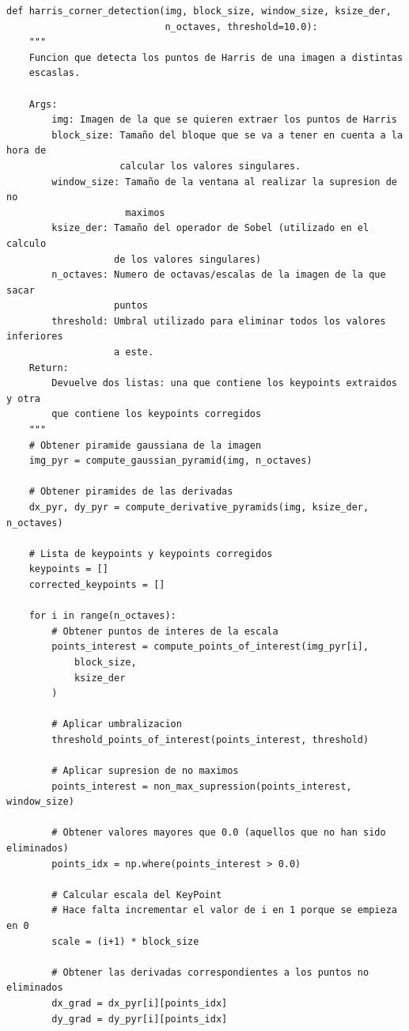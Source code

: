 \documentclass[11pt,a4paper]{article}
\begin{document}
\begin{lstlisting}
def harris_corner_detection(img, block_size, window_size, ksize_der,
                            n_octaves, threshold=10.0):
    """
    Funcion que detecta los puntos de Harris de una imagen a distintas
    escaslas.

    Args:
        img: Imagen de la que se quieren extraer los puntos de Harris
        block_size: Tamaño del bloque que se va a tener en cuenta a la hora de
                    calcular los valores singulares.
        window_size: Tamaño de la ventana al realizar la supresion de no
                     maximos
        ksize_der: Tamaño del operador de Sobel (utilizado en el calculo
                   de los valores singulares)
        n_octaves: Numero de octavas/escalas de la imagen de la que sacar
                   puntos
        threshold: Umbral utilizado para eliminar todos los valores inferiores
                   a este.
    Return:
        Devuelve dos listas: una que contiene los keypoints extraidos y otra
        que contiene los keypoints corregidos
    """
    # Obtener piramide gaussiana de la imagen
    img_pyr = compute_gaussian_pyramid(img, n_octaves)

    # Obtener piramides de las derivadas
    dx_pyr, dy_pyr = compute_derivative_pyramids(img, ksize_der, n_octaves)

    # Lista de keypoints y keypoints corregidos
    keypoints = []
    corrected_keypoints = []

    for i in range(n_octaves):
        # Obtener puntos de interes de la escala
        points_interest = compute_points_of_interest(img_pyr[i],
            block_size,
            ksize_der
        )

        # Aplicar umbralizacion
        threshold_points_of_interest(points_interest, threshold)

        # Aplicar supresion de no maximos
        points_interest = non_max_supression(points_interest, window_size)

        # Obtener valores mayores que 0.0 (aquellos que no han sido eliminados)
        points_idx = np.where(points_interest > 0.0)

        # Calcular escala del KeyPoint
        # Hace falta incrementar el valor de i en 1 porque se empieza en 0
        scale = (i+1) * block_size

        # Obtener las derivadas correspondientes a los puntos no eliminados
        dx_grad = dx_pyr[i][points_idx]
        dy_grad = dy_pyr[i][points_idx]


\end{lstlisting}
\end{document}
